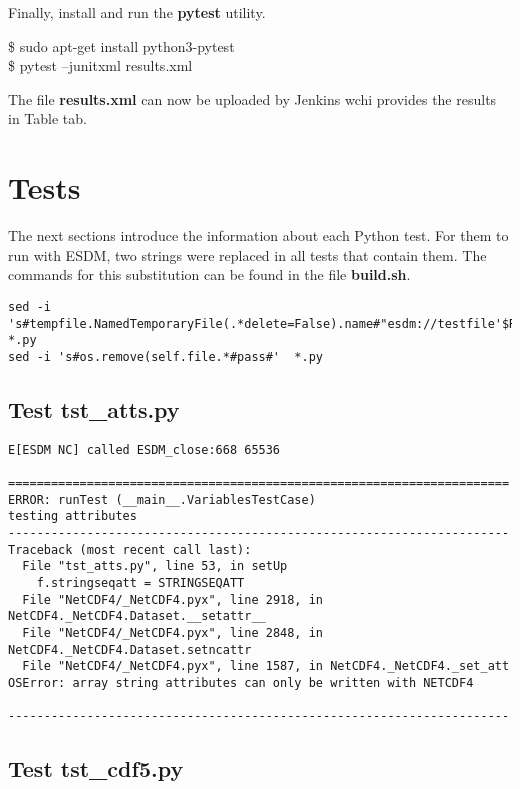 Finally, install and run the \textbf{pytest} utility.

\begin{framed}
\$ sudo apt-get install python3-pytest \\
\$ pytest --junitxml results.xml
\end{framed}

The file \textbf{results.xml} can now be uploaded by Jenkins wchi provides the results in Table tab.

\section{Tests}


The next sections introduce the information about each Python test. For them to run with ESDM, two strings were replaced in all tests that contain them. The commands for this substitution can be found in the file \textbf{build.sh}.

\begin{verbatim}
sed -i 's#tempfile.NamedTemporaryFile(.*delete=False).name#"esdm://testfile'$RANDOM'"#'  *.py
sed -i 's#os.remove(self.file.*#pass#'  *.py
\end{verbatim}

\subsection{Test tst\_atts.py}

\begin{verbatim}
E[ESDM NC] called ESDM_close:668 65536

======================================================================
ERROR: runTest (__main__.VariablesTestCase)
testing attributes
----------------------------------------------------------------------
Traceback (most recent call last):
  File "tst_atts.py", line 53, in setUp
    f.stringseqatt = STRINGSEQATT
  File "NetCDF4/_NetCDF4.pyx", line 2918, in NetCDF4._NetCDF4.Dataset.__setattr__
  File "NetCDF4/_NetCDF4.pyx", line 2848, in NetCDF4._NetCDF4.Dataset.setncattr
  File "NetCDF4/_NetCDF4.pyx", line 1587, in NetCDF4._NetCDF4._set_att
OSError: array string attributes can only be written with NETCDF4

----------------------------------------------------------------------
\end{verbatim}

\subsection{Test tst\_cdf5.py}

